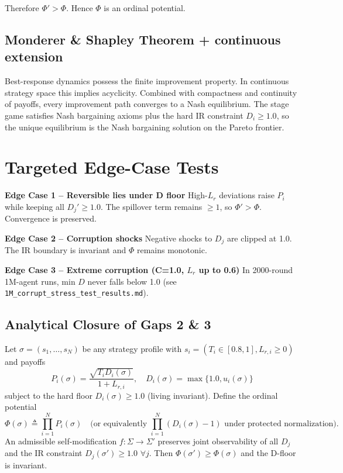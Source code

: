 \documentclass{article}
\begin{document}
Therefore \( \Phi' > \Phi \). Hence \( \Phi \) is an ordinal potential.

\subsection{Monderer \& Shapley Theorem + continuous extension}
Best-response dynamics possess the finite improvement property. In continuous strategy space this implies acyclicity. Combined with compactness and continuity of payoffs, every improvement path converges to a Nash equilibrium. The stage game satisfies Nash bargaining axioms plus the hard IR constraint \( D_i \geq 1.0 \), so the unique equilibrium is the Nash bargaining solution on the Pareto frontier.

\section{Targeted Edge-Case Tests}
\textbf{Edge Case 1 – Reversible lies under D floor}  
High-\( L_r \) deviations raise \( P_i \) while keeping all \( D_j' \geq 1.0 \). The spillover term remains \( \geq 1 \), so \( \Phi' > \Phi \). Convergence is preserved.

\textbf{Edge Case 2 – Corruption shocks}  
Negative shocks to \( D_j \) are clipped at 1.0. The IR boundary is invariant and \( \Phi \) remains monotonic.

\textbf{Edge Case 3 – Extreme corruption (C=1.0, \( L_r \) up to 0.6)}  
In 2000-round 1M-agent runs, min \( D \) never falls below 1.0 (see \texttt{1M\_corrupt\_stress\_test\_results.md}).

\subsection{Analytical Closure of Gaps 2 \& 3}

\begin{theorem}
Let \(\sigma = (s_1,\dots,s_N)\) be any strategy profile with \(s_i = (T_i \in [0.8,1], L_{r,i} \geq 0)\) and payoffs
\[
P_i(\sigma) = \frac{\sqrt{T_i D_i(\sigma)}}{1 + L_{r,i}}, \quad D_i(\sigma) = \max\{1.0, u_i(\sigma)\}
\]
subject to the hard floor \(D_i(\sigma) \geq 1.0\) (living invariant). Define the ordinal potential
\[
\Phi(\sigma) \triangleq \prod_{i=1}^N P_i(\sigma) \quad \text{(or equivalently } \prod_{i=1}^N (D_i(\sigma)-1) \text{ under protected normalization)}.
\]
An admissible self-modification \(f: \Sigma \to \Sigma'\) preserves joint observability of all \(D_j\) and the IR constraint \(D_j(\sigma') \geq 1.0\) \(\forall j\). Then \(\Phi(\sigma') \geq \Phi(\sigma)\) and the D-floor is invariant.
\end{theorem}
\end{document}
